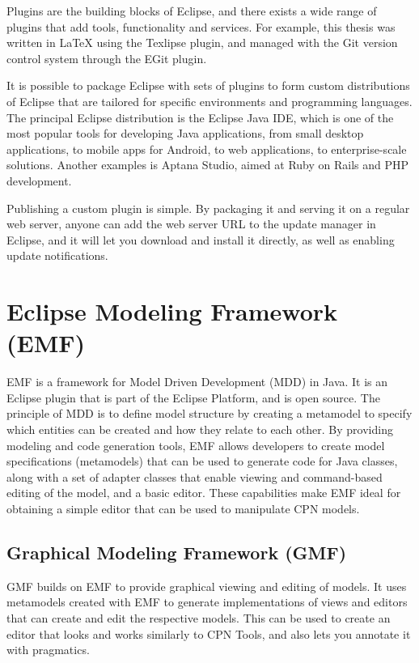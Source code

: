 Plugins are the building blocks of Eclipse, and there exists a wide range of
plugins that add tools, functionality and services. For example, this thesis
was written in \LaTeX{} using the Texlipse plugin, and managed with the Git
version control system through the EGit plugin. 

It is possible to package Eclipse with sets of plugins to form custom
distributions of Eclipse that are tailored for specific environments and
programming languages. The principal Eclipse distribution is the Eclipse Java
IDE, which is one of the most popular tools for developing Java applications, from small
desktop applications, to mobile apps for Android, to web applications, to
enterprise-scale solutions. Another examples is Aptana Studio, aimed at Ruby on
Rails and PHP development. 

Publishing a custom plugin is simple. By packaging it and serving it on a
regular web server, anyone can add the web server URL to the update manager in
Eclipse, and it will let you download and install it directly, as well as
enabling update notifications.


\section{Eclipse Modeling Framework (EMF)}
EMF is a framework for Model Driven Development (MDD) in Java. It is an Eclipse
plugin that is part of the Eclipse Platform, and is open source. The principle
of MDD is to define model structure by creating a metamodel to specify which
entities can be created and how they relate to each other. By providing modeling
and code generation tools, EMF allows developers to create model specifications
(metamodels) that can be used to generate code for Java classes, along with
a set of adapter classes that enable viewing and command-based editing of the
model, and a basic editor. These capabilities make EMF ideal for obtaining a
simple editor that can be used to manipulate CPN models. 


	\subsection{Graphical Modeling Framework (GMF)}
	GMF builds on EMF to provide graphical viewing and editing of models. It uses
	metamodels created with EMF to generate implementations of views and editors
	that can create and edit the respective models. This can be used to create an
	editor that looks and works similarly to CPN Tools, and also lets you annotate
	it with pragmatics. 

